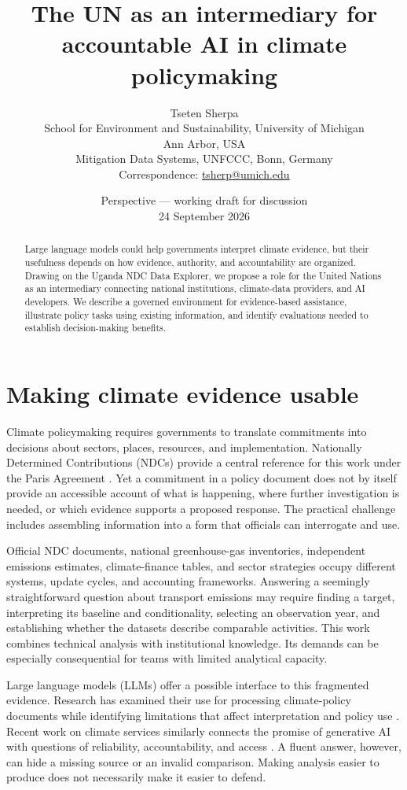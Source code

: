 \documentclass[11pt]{article}
\title{The UN as an intermediary for accountable AI in climate policymaking}
\author{Tseten Sherpa\\[0.5em]
\small School for Environment and Sustainability, University of Michigan\\
\small Ann Arbor, USA\\
\small Mitigation Data Systems, UNFCCC, Bonn, Germany\\
\small Correspondence: \href{mailto:tsherp@umich.edu}{tsherp@umich.edu}}
\date{Perspective --- working draft for discussion\\24 September 2026}
\begin{document}
\maketitle

\begin{abstract}
Large language models could help governments interpret climate evidence, but their usefulness depends on how evidence, authority, and accountability are organized. Drawing on the Uganda NDC Data Explorer, we propose a role for the United Nations as an intermediary connecting national institutions, climate-data providers, and AI developers. We describe a governed environment for evidence-based assistance, illustrate policy tasks using existing information, and identify evaluations needed to establish decision-making benefits.
\end{abstract}

\section*{Making climate evidence usable}

Climate policymaking requires governments to translate commitments into decisions about sectors, places, resources, and implementation. Nationally Determined Contributions (NDCs) provide a central reference for this work under the Paris Agreement \cite{paris2015}. Yet a commitment in a policy document does not by itself provide an accessible account of what is happening, where further investigation is needed, or which evidence supports a proposed response. The practical challenge includes assembling information into a form that officials can interrogate and use.

Official NDC documents, national greenhouse-gas inventories, independent emissions estimates, climate-finance tables, and sector strategies occupy different systems, update cycles, and accounting frameworks. Answering a seemingly straightforward question about transport emissions may require finding a target, interpreting its baseline and conditionality, selecting an observation year, and establishing whether the datasets describe comparable activities. This work combines technical analysis with institutional knowledge. Its demands can be especially consequential for teams with limited analytical capacity.

Large language models (LLMs) offer a possible interface to this fragmented evidence. Research has examined their use for processing climate-policy documents while identifying limitations that affect interpretation and policy use \cite{larosa2025}. Recent work on climate services similarly connects the promise of generative AI with questions of reliability, accountability, and access \cite{williams2026}. A fluent answer, however, can hide a missing source or an invalid comparison. Making analysis easier to produce does not necessarily make it easier to defend.
\end{document}

